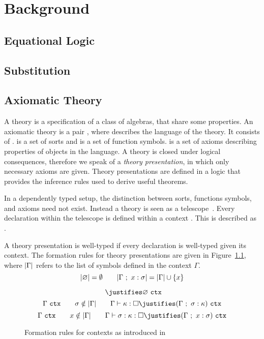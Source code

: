 \chapter{Background}

\section{Equational Logic}

\section{Substitution}

\section{Axiomatic Theory}
\label{sec:background:theory}
A theory is a specification of a class of algebras, that share some properties. 
An axiomatic theory is a pair , where  describes the language of the theory. It consists of .  is a set of sorts and  is a set of function symbols. \lstmath{$\Sigma$} is a set of axioms describing properties of objects in the language. A theory is closed under logical consequences, therefore we speak of a \emph{theory presentation}, in which only necessary axioms are given. Theory presentations are defined in a logic that provides the inference rules used to derive useful theorems.  

In a dependently typed setup, the distinction between sorts, functions symbols, and axioms need not exist. Instead a theory is seen as a telescope~\cite{de1991telescopic}. Every declaration  within the telescope is defined within a context \lstmath{$\Gamma$}. This is described as .  

A theory presentation is well-typed if every declaration  is well-typed given its context. The formation rules for theory presentations are given in Figure~\ref{fig:ctx}, where $| \Gamma |$ refers to the list of symbols defined in the context $\Gamma$. 
$$ | \varnothing | = \emptyset \qquad
| \Gamma\ ;\ x : \sigma | = | \Gamma | \cup \left\{ x \right\}
$$
\begin{figure}[ht]
    \begin{proofrules}
        \[ \ \justifies \varnothing \ \wfctx \]
        \[ \context{\Gamma}\ \wfctx \qquad \sigma \notin \syms{\context{\Gamma}}
        \qquad \context{\Gamma} \vdash \kappa : \Box \justifies
        (\context{\Gamma}\ ;\ \sigma : \kappa)\ \wfctx \]
        \[ \context{\Gamma}\ \wfctx \qquad x\notin \syms{\context{\Gamma}}
        \qquad \context{\Gamma} \vdash \sigma : \kappa : \Box \justifies
        (\context{\Gamma}\ ;\ x : \sigma)\ \wfctx \]
    \end{proofrules}
    \caption{Formation rules for contexts as introduced in~\cite{carette2018building}}
    \label{fig:ctx}
\end{figure}

